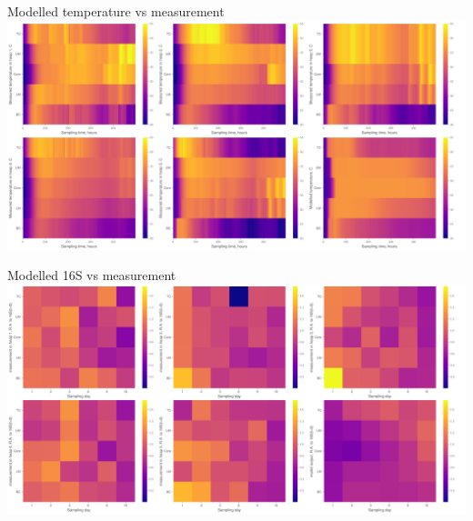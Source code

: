 \documentclass[mathserif,11pt]{beamer}
\begin{document}
\begin{frame}{Modelled temperature vs measurement}
		\centering
	\includegraphics[width=\textwidth]{Figures/GA_model_vs_all_heaps_temperature.png}
\end{frame}
\begin{frame}{Modelled 16S vs measurement}
		\centering
	\includegraphics[width=\textwidth]{Figures/GA_model_vs_all_heaps_Sensitive.png}
\end{frame}
\end{document}
